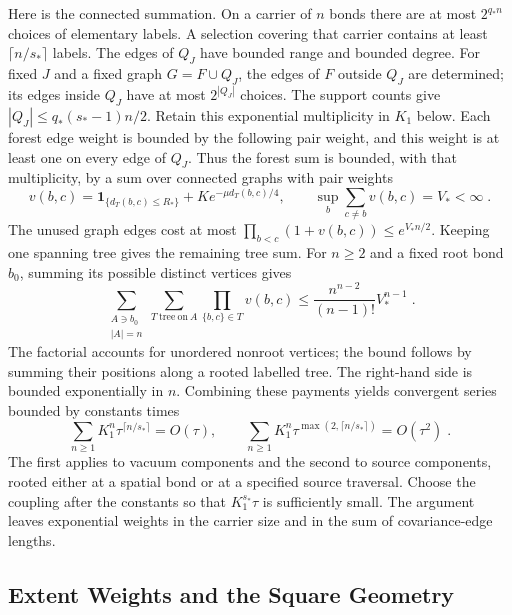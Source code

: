 \documentclass[11pt]{article}
\begin{document}
Here is the connected summation. On a carrier of $n$ bonds there are at most $2^{q_*n}$ choices of elementary labels. A selection covering that carrier contains at least $\lceil n/s_*\rceil$ labels. The edges of $Q_J$ have bounded range and bounded degree. For fixed $J$ and a fixed graph $G=F\cup Q_J$, the edges of $F$ outside $Q_J$ are determined; its edges inside $Q_J$ have at most $2^{|Q_J|}$ choices. The support counts give $|Q_J|\leq q_*(s_*-1)n/2$. Retain this exponential multiplicity in $K_1$ below. Each forest edge weight is bounded by the following pair weight, and this weight is at least one on every edge of $Q_J$. Thus the forest sum is bounded, with that multiplicity, by a sum over connected graphs with pair weights
\begin{equation}\label{eq:marginal-counting-weight}
    v(b,c)=\mathbf1_{\{d_T(b,c)\leq R_*\}}
        +K e^{-\mu d_T(b,c)/4},
    \qquad \sup_b\sum_{c\ne b}v(b,c)=V_*<\infty\;.
\end{equation}
The unused graph edges cost at most $\prod_{b<c}(1+v(b,c))\leq e^{V_*n/2}$. Keeping one spanning tree gives the remaining tree sum. For $n\geq 2$ and a fixed root bond $b_0$, summing its possible distinct vertices gives
\begin{equation}\label{eq:marginal-rooted-tree-count}
    \sum_{\substack{A\ni b_0\\|A|=n}}
        \sum_{T\ \mathrm{tree\ on}\ A}\prod_{\{b,c\}\in T}v(b,c)
        \leq \frac{n^{n-2}}{(n-1)!}V_*^{n-1}\;.
\end{equation}
The factorial accounts for unordered nonroot vertices; the bound follows by summing their positions along a rooted labelled tree. The right-hand side is bounded exponentially in $n$. Combining these payments yields convergent series bounded by constants times
\begin{equation}\label{eq:marginal-load-series}
    \sum_{n\geq 1}K_1^n\tau^{\lceil n/s_*\rceil}=O(\tau),
    \qquad
    \sum_{n\geq 1}K_1^n\tau^{\max(2,\lceil n/s_*\rceil)}=O(\tau^2)\;.
\end{equation}
The first applies to vacuum components and the second to source components, rooted either at a spatial bond or at a specified source traversal. Choose the coupling after the constants so that $K_1^{s_*}\tau$ is sufficiently small. The argument leaves exponential weights in the carrier size and in the sum of covariance-edge lengths.

\subsection{Extent Weights and the Square Geometry}
\end{document}
